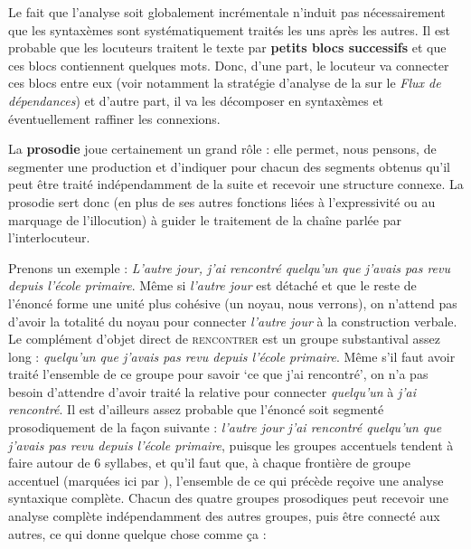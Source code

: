 {    Le fait que l’analyse soit globalement incrémentale n’induit pas nécessairement que les syntaxèmes sont systématiquement traités les uns après les autres. Il est probable que les locuteurs traitent le texte par \textbf{petits blocs successifs} et que ces blocs contiennent quelques mots. Donc, d’une part, le locuteur va connecter ces blocs entre eux (voir notamment la stratégie d’analyse de la  sur le \textit{Flux de dépendances}) et d’autre part, il va les décomposer en syntaxèmes et éventuellement raffiner les connexions.

    La \textbf{prosodie} joue certainement un grand rôle : elle permet, nous pensons, de segmenter une production et d’indiquer pour chacun des segments obtenus qu’il peut être traité indépendamment de la suite et recevoir une structure connexe. La prosodie sert donc (en plus de ses autres fonctions liées à l’expressivité ou au marquage de l’illocution) à guider le traitement de la chaîne parlée par l’interlocuteur.

    Prenons un exemple : \textit{L’autre jour, j’ai rencontré quelqu’un que j’avais pas revu depuis l’école primaire}. Même si \textit{l’autre jour} est détaché et que le reste de l’énoncé forme une unité plus cohésive (un noyau, nous verrons), on n’attend pas d’avoir la totalité du noyau pour connecter \textit{l’autre jour} à la construction verbale. Le complément d’objet direct de \textsc{rencontrer} est un groupe substantival assez long : \textit{quelqu’un que j’avais pas revu depuis l’école primaire}. Même s’il faut avoir traité l’ensemble de ce groupe pour savoir ‘ce que j’ai rencontré’, on n’a pas besoin d’attendre d’avoir traité la relative pour connecter \textit{quelqu’un} à \textit{j’ai rencontré}. Il est d’ailleurs assez probable que l’énoncé soit segmenté prosodiquement de la façon suivante : \textit{l’autre jour {\textbar} j’ai rencontré quelqu’un {\textbar} que j’avais pas revu {\textbar} depuis l’école primaire}, puisque les groupes accentuels tendent à faire autour de 6 syllabes, et qu’il faut que, à chaque frontière de groupe accentuel (marquées ici par {\textbar} ), l’ensemble de ce qui précède reçoive une analyse syntaxique complète. Chacun des quatre groupes prosodiques peut recevoir une analyse complète indépendamment des autres groupes, puis être connecté aux autres, ce qui donne quelque chose comme ça :

    \begin{figure}
    \caption{\label{fig:}}
    \end{figure}

}

